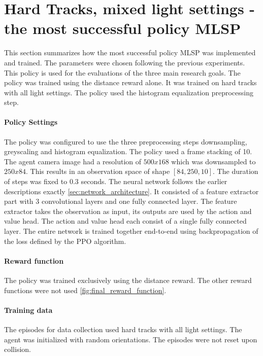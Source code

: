 \section{Hard Tracks, mixed light settings - the most successful policy \acs{MLSP}}
\label{sec:most_successful_policy}

This section summarizes how the most successful policy \acs{MLSP} was implemented and trained. The parameters were chosen following the previous experiments. This policy is used for the evaluations of the three main research goals.
The policy was trained using the distance reward alone. It was trained on hard tracks with all light settings. The policy used the histogram equalization preprocessing step.

\paragraph{Policy Settings}
The policy was configured to use the three preprocessing steps downsampling, greyscaling and histogram equalization. The policy used a frame stacking of 10. The agent camera image had a resolution of $500x168$ which was downsampled to $250x84$. This results in an observation space of shape $[84, 250, 10]$. The duration of steps was fixed to $0.3$ seconds.
The neural network follows the earlier descriptions exactly \ref{sec:network_architecture}. It consisted of a feature extractor part with 3 convolutional layers and one fully connected layer. The feature extractor takes the observation as input, its outputs are used by the action and value head. The action and value head each consist of a single fully connected layer. The entire network is trained together end-to-end using backpropagation of the loss defined by the PPO algorithm.

\paragraph{Reward function}
The policy was trained exclusively using the distance reward. The other reward functions were not used \ref{fig:final_reward_function}.

\paragraph{Training data}
The episodes for data collection used hard tracks with all light settings. The agent was initialized with random orientations. The episodes were not reset upon collision.

